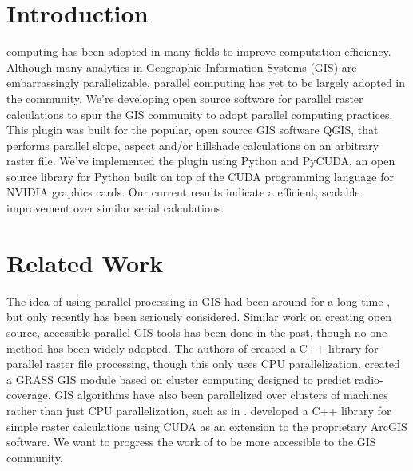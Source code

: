 \documentclass[journal]{IEEEtran}
\begin{document}
\section{Introduction}
% 
% 
% 
% 
 computing has been adopted in many fields to improve
computation efficiency. Although many analytics in Geographic Information
Systems (GIS) are embarrassingly parallelizable, parallel computing has yet to
be largely adopted in the community. We're developing open source software for
parallel raster calculations to spur the GIS community to adopt parallel
computing practices. This plugin was built for the popular, open source GIS
software QGIS, that performs parallel slope, aspect and/or hillshade calculations 
on an arbitrary raster file.  We've implemented the plugin using Python and 
PyCUDA, an open source library for Python built on top of the CUDA programming
language for \textsc{NVIDIA} graphics cards. Our current results indicate a 
efficient, scalable improvement over similar serial calculations.

\section{Related Work} \label{related}
The idea of using parallel processing in GIS had been around for a long time
\cite{healy}, but only recently has been seriously considered.  Similar work on
creating open source, accessible parallel GIS tools has been done in the past,
though no one method has been widely adopted. The authors of \cite{guan}
created a C++ library for parallel raster file processing, though this only
uses CPU parallelization. \cite{benedicic} created a GRASS GIS module based on
cluster computing designed to predict radio-coverage.  GIS algorithms have also
been parallelized over clusters of machines rather than just CPU
parallelization, such as in \cite{huang}.  \cite{hpc_cuda} developed a C++
library for simple raster calculations using CUDA as an extension to the
proprietary ArcGIS software. We want to progress the work of \cite{hpc_cuda} to
be more accessible to the GIS community.
\end{document}
